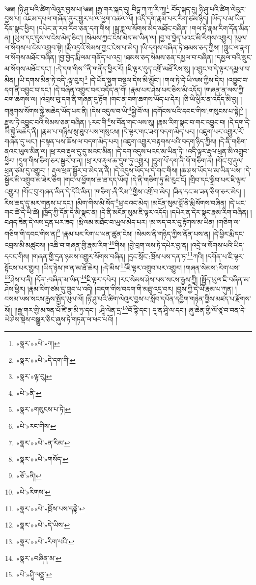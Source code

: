 ༄༅། །ཉི་ཤུ་པའི་ཚིག་ལེའུར་བྱས་པ།༄༅། །རྒྱ་གར་སྐད་དུ། བིངྴ་ཀ་ཀཱ་རི་ཀཱ།\footnote{«སྣར་»«པེ་»ཀ།} བོད་སྐད་དུ། ཉི་ཤུ་པའི་ཚིག་ལེའུར་བྱས་པ། འཇམ་དཔལ་གཞོན་ནུར་གྱུར་པ་ལ་ཕྱག་འཚལ་ལོ། །འདི་དག་རྣམ་པར་རིག་ཙམ་ཉིད། །ཡོད་པ་མ་ཡིན་དོན་སྣང་ཕྱིར། །དཔེར་ན་རབ་རིབ་ཅན་དག་གིས། །སྐྲ་ཟླ་ལ་སོགས་མེད་མཐོང་བཞིན། །གལ་ཏེ་རྣམ་རིག་དོན་མིན་ན། །ཡུལ་དང་དུས་ལ་ངེས་མེད་ཅིང་། །སེམས་ཀྱང་ངེས་མེད་མ་ཡིན་ལ། །བྱ་བ་བྱེད་པའང་མི་རིགས་འགྱུར། །ཡུལ་ལ་སོགས་པ་ངེས་འགྲུབ་སྟེ། །རྨི་འདྲའོ་སེམས་ཀྱང་ངེས་པ་མེད། །ཡི་དགས་བཞིན་ཏེ་ཐམས་ཅད་ཀྱིས། །ཀླུང་ལ་རྣག་ལ་སོགས་མཐོང་བཞིན། །བྱ་བྱེད་རྨི་ལམ་གནོད་པ་འདྲ། །ཐམས་ཅད་སེམས་ཅན་དམྱལ་བ་བཞིན། །དམྱལ་བའི་སྲུང་མ་སོགས་མཐོང་དང་། །:དེ་དག་གིས་\footnote{«སྣར་»«པེ་»དེ་དག་གི་}ནི་གནོད་ཕྱིར་རོ། །ཇི་ལྟར་དུད་འགྲོ་མཐོ་རིས་སུ། །འབྱུང་བ་དེ་ལྟར་དམྱལ་བ་མིན། །ཡི་དགས་མིན་ཏེ་འདི་:ལྟ་བུར།\footnote{«སྣར་»ལྟ་བུ།} །དེ་ཡོད་སྡུག་བསྔལ་དེས་མི་མྱོང་། །གལ་ཏེ་དེ་ཡི་ལས་ཀྱིས་དེར། །འབྱུང་བ་དག་ནི་འབྱུང་བ་དང་། །དེ་བཞིན་འགྱུར་བར་འདོད་ན་གོ། །རྣམ་པར་ཤེས་པར་ཅིས་མི་འདོད། །གཞན་ན་ལས་ཀྱི་བག་ཆགས་ལ། །འབྲས་བུ་དག་ནི་གཞན་དུ་རྟོག །གང་ན་བག་ཆགས་ཡོད་པ་དེར། །ཅི་ཡི་ཕྱིར་ན་འདོད་མི་བྱ། །གཟུགས་སོགས་སྐྱེ་མཆེད་ཡོད་པར་ནི། །དེས་འདུལ་བ་ཡི་\footnote{«པེ་»ནི་}སྐྱེ་བོ་ལ། །དགོངས་པའི་དབང་གིས་:གསུངས་པ་སྟེ།\footnote{«སྣར་»གསུངས་པ་ཏེ།} །རྫུས་ཏེ་འབྱུང་བའི་སེམས་ཅན་བཞིན། །:རང་གི་\footnote{«པེ་»རང་གིས་}ས་བོན་གང་ལས་སུ། །རྣམ་རིག་སྣང་བ་གང་འབྱུང་བ། །དེ་དག་དེ་ཡི་སྐྱེ་མཆེད་ནི། །རྣམ་པ་གཉིས་སུ་ཐུབ་པས་གསུངས། །དེ་ལྟར་གང་ཟག་བདག་མེད་པར། །འཇུག་པར་འགྱུར་རོ་གཞན་དུ་ཡང་། །བསྟན་པས་ཆོས་ལ་བདག་མེད་པར། །འཇུག་འགྱུར་བརྟགས་པའི་བདག་ཉིད་ཀྱིས། །དེ་ནི་གཅིག་ནའང་ཡུལ་མིན་ལ། །ཕྲ་རབ་རྡུལ་དུ་དུ་མའང་མིན། །དེ་དག་འདུས་པའང་མ་ཡིན་ཏེ། །འདི་ལྟར་རྡུལ་ཕྲན་མི་འགྲུབ་ཕྱིར། །དྲུག་གིས་ཅིག་ཅར་སྦྱར་བ་ན། །ཕྲ་རབ་རྡུལ་ཆ་དྲུག་ཏུ་འགྱུར། །དྲུག་པོ་དག་ནི་གོ་གཅིག་ན། །གོང་བུ་རྡུལ་ཕྲན་ཙམ་དུ་འགྱུར། །
རྡུལ་ཕྲན་སྦྱོར་བ་མེད་ན་ནི། །དེ་འདུས་ཡོད་པ་དེ་གང་གིས། །ཆ་ཤས་ཡོད་པ་མ་ཡིན་པས། །དེ་སྦྱོར་མི་འགྲུབ་མ་ཟེར་ཅིག །གང་ལ་ཕྱོགས་ཆ་ཐ་དད་ཡོད། །དེ་ནི་གཅིག་ཏུ་མི་རུང་ངོ། །གྲིབ་དང་སྒྲིབ་པར་ཇི་ལྟར་འགྱུར། །གོང་བུ་གཞན་མིན་དེ་དེའི་མིན། །གཅིག་:ནི་རིམ་\footnote{«སྣར་»«པེ་»ན་རིམ་}གྱིས་འགྲོ་བ་མེད། །ཟིན་དང་མ་ཟན་ཅིག་ཅར་མེད། །རིས་ཆད་དུ་མར་གནས་པ་དང་། །མིག་གིས་མི་སོད་\footnote{«སྣར་»«པེ་»གསོད་}ཕྲ་བའང་མེད། །མངོན་སུམ་བློ་ནི་རྨི་སོགས་བཞིན། །དེ་ཡང་གང་ཚེ་དེ་ཡི་ཚེ། །ཁྱོད་ཀྱི་དོན་དེ་མི་སྣང་ན། །དེ་ནི་མངོན་སུམ་ཇི་ལྟར་འདོད། །དཔེར་ན་དེར་སྣང་རྣམ་རིག་བཞིན། །བཤད་ཟིན་དེ་ལས་དྲན་པར་ཟད། །རྨི་ལམ་མཐོང་བ་ཡུལ་མེད་པར། །མ་སད་བར་དུ་རྟོགས་མ་ཡིན། །གཅིག་ལ་གཅིག་གི་དབང་གིས་ན།\footnote{«ཅོ་»ནི།} །རྣམ་པར་རིག་པ་ཕན་ཚུན་ངེས། །སེམས་ནི་གཉིད་ཀྱིས་ནོན་པས་ན། །དེ་ཕྱིར་རྨི་དང་འབྲས་མི་མཚུངས། །འཆི་བ་གཞན་གྱི་རྣམ་རིག་\footnote{«པེ་»རིགས་}གིས། །བྱེ་བྲག་ལས་ཏེ་དཔེར་བྱ་ན། །འདྲེ་ལ་སོགས་པའི་ཡིད་དབང་གིས། །གཞན་གྱི་དྲན་ཉམས་འགྱུར་སོགས་བཞིན། །དྲང་སྲོང་:ཁྲོས་པས་དན་ཏ་\footnote{«སྣར་»«པེ་»ཁྲོས་པས་དནྟེ་}ཀའི། །དགོན་པ་ཇི་ལྟར་སྟོངས་པར་གྱུར། །ཡིད་ཉེས་ཁ་ན་མ་ཐོ་ཆེར། །:དེ་མིས་\footnote{«སྣར་»«པེ་»དེ་ཡིས་}ཇི་ལྟར་འགྲུབ་པར་འགྱུར། །གཞན་སེམས་:རིག་པས་\footnote{«སྣར་»«པེ་»རིག་པའི་}ཤེས་པ་ནི། །དོན་:བཞིན་མ་ཡིན་\footnote{«སྣར་»བཞིན་མ་}ཇི་ལྟར་དཔེར། །རང་སེམས་ཤེས་པས་སངས་རྒྱས་ཀྱི། །སྤྱོད་ཡུལ་ཇི་བཞིན་མ་ཤེས་ཕྱིར། །རྣམ་རིག་ཙམ་དུ་གྲུབ་པ་འདི། །བདག་གིས་བདག་གི་མཐུ་འདྲ་བར། །བྱས་ཀྱི་དེ་ཡི་རྣམ་པ་ཀུན། །བསམ་ཡས་སངས་རྒྱས་སྤྱོད་ཡུལ་ལོ། །ཉི་ཤུ་པའི་ཚིག་ལེའུར་བྱས་པ་སློབ་དཔོན་དབྱིག་གཉེན་གྱིས་མཛད་པ་རྫོགས་སོ།། །།རྒྱ་གར་གྱི་མཁན་པོ་ཛི་ན་མི་ཏྲ་དང་། :ཤཱི་ལེན་དྲ་\footnote{«པེ་»ཤཱི་ལནྡྲ་}བོ་དྷི་དང་། དཱ་ན་ཤཱི་ལ་དང་། ཞུ་ཆེན་གྱི་ལོ་ཙཱ་བ་བན་དེ་ཡེ་ཤེས་སྡེས་བསྒྱུར་ཅིང་ཞུས་ཏེ་གཏན་ལ་ཕབ་པའོ། །